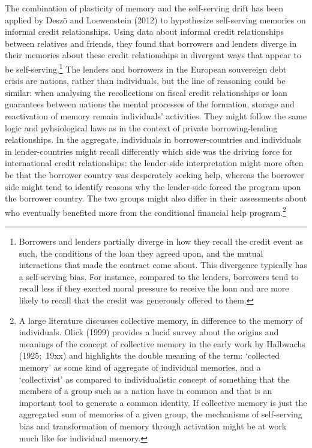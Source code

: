 \documentclass[12pt]{article}
\begin{document}
The combination of plasticity of memory and the self-serving drift has been
applied by Desz\"{o} and Loewenstein (2012) to hypothesize self-serving
memories on informal credit relationships. Using data about informal credit
relationships between relatives and friends, they found that borrowers and
lenders diverge in their memories about these credit relationships in
divergent ways that appear to be self-serving.\footnote{%
Borrowers and lenders partially diverge in how they recall the credit event
as such, the conditions of the loan they agreed upon, and the mutual
interactions that made the contract come about. This divergence typically
has a self-serving bias. For instance, compared to the lenders, borrowers
tend to recall less if they exerted moral pressure to receive the loan and
are more likely to recall that the credit was generously offered to them.}
The lenders and borrowers in the European souvereign debt crisis are
nations, rather than individuals, but the line of reasoning could be
similar: when analysing the recollections on fiscal credit relationships or
loan guarantees between nations the mental processes of the formation,
storage and reactivation of memory remain individuals' activities. They
might follow the same logic and pyhsiological laws as in the context of
private borrowing-lending relationships. In the aggregate, individuals in
borrower-countries and individuals in lender-countries might recall
differently which side was the driving force for international credit
relationships: the lender-side interpretation might more often be that the
borrower country was desperately seeking help, whereas the borrower side
might tend to identify reasons why the lender-side forced the program upon
the borrower country. The two groups might also differ in their assessments
about who eventually benefited more from the conditional financial help
program.\footnote{%
A large literature discusses collective memory, in difference to the memory
of individuals. Olick (1999) provides a lucid survey about the origins and
meanings of the concept of collective memory in the early work by Halbwachs
(1925;\ 19xx) and highlights the double meaning of the term: `collected
memory' as some kind of aggregate of individual memories, and a
`collectivist' as compared to individualistic concept of something that the
members of a group such as a nation have in common and that is an important
tool to generate a common identity. If collective memory is just the
aggregated sum of memories of a given group, the mechanisms of self-serving
bias and transformation of memory through activation might be at work much
like for individual memory.}
\end{document}
